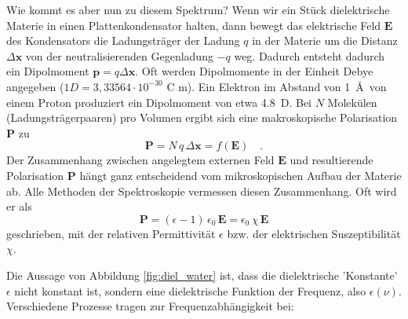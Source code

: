
Wie kommt es aber nun zu diesem Spektrum? Wenn wir ein Stück dielektrische Materie in einen Plattenkondensator halten, dann bewegt das elektrische Feld $\mathbf{E}$ des Kondensators die Ladungsträger der Ladung $q$ in der Materie um  die Distanz $\Delta  \mathbf{x}$ von der neutralisierenden Gegenladung $-q$ weg. Dadurch entsteht dadurch ein Dipolmoment $\mathbf{p} = q \Delta \mathbf{x}$. Oft werden Dipolmomente in der Einheit Debye angegeben ($1 D = 3{,}33564 \cdot 10^{-30}$ C  m). Ein Elektron im Abstand von 1~\AA\ von einem Proton produziert ein Dipolmoment von etwa 4.8~D. Bei $N$ Molekülen (Ladungsträgerpaaren) pro Volumen ergibt sich eine makroskopische Polarisation $\mathbf{P}$ zu
\begin{equation}
\mathbf{P} = N \, q \, \Delta \mathbf{x} = f(\mathbf{E}) \quad .
\end{equation}
Der Zusammenhang zwischen angelegtem externen Feld $\mathbf{E}$ und resultierende 
Polarisation $\mathbf{P}$ hängt ganz entscheidend vom mikroskopischen Aufbau der Materie ab. Alle Methoden der Spektroskopie vermessen diesen Zusammenhang. Oft wird er als 
\begin{equation}
 \mathbf{P} =  (\epsilon - 1) \, \epsilon_0 \, \mathbf{E} = \epsilon_0 \,\chi \, \mathbf{E} 
 \label{eq:diel_p_lin}
\end{equation}
geschrieben, mit der relativen Permittivität $\epsilon$ bzw. der elektrischen Suszeptibilität $\chi$. 


Die Aussage von Abbildung \ref{fig:diel_water} ist, dass die  dielektrische 'Konstante' $\epsilon$   nicht  konstant ist, sondern eine dielektrische Funktion der Frequenz, also $\epsilon(\nu)$. Verschiedene Prozesse tragen zur Frequenzabhängigkeit bei:




